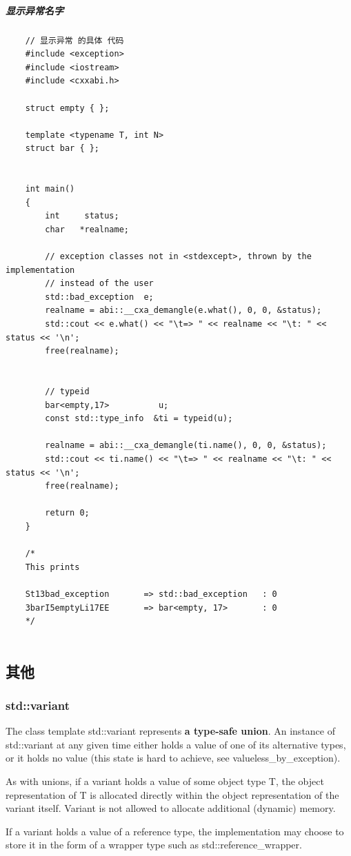 \documentclass[UTF8,a4paper,12pt]{ctexbook}
\begin{document}
	\subparagraph{显示异常名字}
\begin{lstlisting}
	// 显示异常 的具体 代码
	#include <exception>
	#include <iostream>
	#include <cxxabi.h>
	
	struct empty { };
	
	template <typename T, int N>
	struct bar { };
	
	
	int main()
	{
		int     status;
		char   *realname;
		
		// exception classes not in <stdexcept>, thrown by the implementation
		// instead of the user
		std::bad_exception  e;
		realname = abi::__cxa_demangle(e.what(), 0, 0, &status);
		std::cout << e.what() << "\t=> " << realname << "\t: " << status << '\n';
		free(realname);
		
		
		// typeid
		bar<empty,17>          u;
		const std::type_info  &ti = typeid(u);
		
		realname = abi::__cxa_demangle(ti.name(), 0, 0, &status);
		std::cout << ti.name() << "\t=> " << realname << "\t: " << status << '\n';
		free(realname);
		
		return 0;
	}
	
	/*
	This prints 
	
	St13bad_exception       => std::bad_exception   : 0
	3barI5emptyLi17EE       => bar<empty, 17>       : 0
	*/
	
\end{lstlisting}	
		\subsection{其他}
			\subsubsection{std::variant}
				The class template std::variant represents\textbf{ a type-safe union}. An instance of std::variant at any given time either holds a value of one of its alternative types, or it holds no value (this state is hard to achieve, see valueless\_by\_exception).
				
				As with unions, if a variant holds a value of some object type T, the object representation of T is allocated directly within the object representation of the variant itself. Variant is not allowed to allocate additional (dynamic) memory.
				
				If a variant holds a value of a reference type, the implementation may choose to store it in the form of a wrapper type such as std::reference\_wrapper.
				
\end{document}

